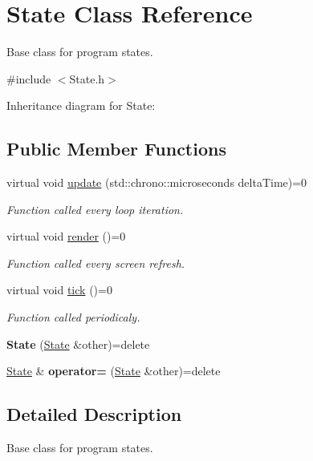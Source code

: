\hypertarget{classState}{\section{State Class Reference}
\label{classState}
}


Base class for program states.  




{\ttfamily \#include $<$State.\-h$>$}



Inheritance diagram for State\-:
\subsection*{Public Member Functions}
\begin{DoxyCompactItemize}
\item 
virtual void \hyperlink{classState_af2121f8eb52144b7a789214f15e3601a}{update} (std\-::chrono\-::microseconds delta\-Time)=0
\begin{DoxyCompactList}\small\item\em Function called every loop iteration. \end{DoxyCompactList}\item 
virtual void \hyperlink{classState_a71f5105bcdc39481be7684d853fe12e9}{render} ()=0
\begin{DoxyCompactList}\small\item\em Function called every screen refresh. \end{DoxyCompactList}\item 
virtual void \hyperlink{classState_a1cdec36e9ffad91ba7af560770601017}{tick} ()=0
\begin{DoxyCompactList}\small\item\em Function called periodicaly. \end{DoxyCompactList}\item 
\hypertarget{classState_a8fba10b9995ce898339f3b0d39234788}{{\bfseries State} (\hyperlink{classState}{State} \&other)=delete}\label{classState_a8fba10b9995ce898339f3b0d39234788}

\item 
\hypertarget{classState_a7ac6cc4de6723746df3dfb183b8eb84f}{\hyperlink{classState}{State} \& {\bfseries operator=} (\hyperlink{classState}{State} \&other)=delete}\label{classState_a7ac6cc4de6723746df3dfb183b8eb84f}

\end{DoxyCompactItemize}


\subsection{Detailed Description}
Base class for program states. 

